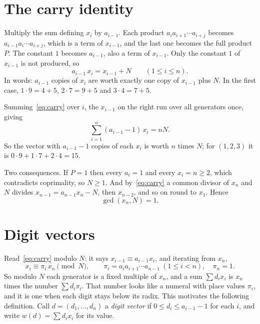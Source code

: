 \documentclass[11pt]{amsart}
\theoremstyle{remark}
\begin{document}
\section{The carry identity}

Multiply the sum defining $x_i$ by $a_{i-1}$. Each product $a_ia_{i+1}\cdots a_{i+j}$ becomes $a_{i-1}a_i\cdots a_{i+j}$, which is a term of $x_{i-1}$, and the last one becomes the full product $P$. The constant $1$ becomes $a_{i-1}$, also a term of $x_{i-1}$. Only the constant $1$ of $x_{i-1}$ is not produced, so
\begin{equation}\label{eq:carry}
a_{i-1}\,x_i=x_{i-1}+N\qquad(1\le i\le n).
\end{equation}
In words: $a_{i-1}$ copies of $x_i$ are worth exactly one copy of $x_{i-1}$ plus $N$. In the first case, $1\cdot9=4+5$, $2\cdot7=9+5$ and $3\cdot4=7+5$.

Summing~\eqref{eq:carry} over $i$, the $x_{i-1}$ on the right run over all generators once, giving
\begin{equation}\label{eq:sum}
\sum_{i=1}^n(a_{i-1}-1)\,x_i=nN .
\end{equation}
So the vector with $a_{i-1}-1$ copies of each $x_i$ is worth $n$ times $N$; for $(1,2,3)$ it is $0\cdot9+1\cdot7+2\cdot4=15$.

Two consequences. If $P=1$ then every $a_i=1$ and every $x_i=n\ge2$, which contradicts coprimality, so $N\ge1$. And by~\eqref{eq:carry} a common divisor of $x_n$ and $N$ divides $x_{n-1}=a_{n-1}x_n-N$, then $x_{n-2}$, and so on round to $x_1$. Hence
\begin{equation}\label{eq:coprime}
\gcd(x_n,N)=1 .
\end{equation}

\section{Digit vectors}

Read~\eqref{eq:carry} modulo $N$: it says $x_{i-1}\equiv a_{i-1}x_i$, and iterating from $x_n$,
\begin{equation}\label{eq:place}
x_i\equiv\pi_i\,x_n\pmod N,\qquad \pi_i=a_ia_{i+1}\cdots a_{n-1}\ (1\le i<n),\quad\pi_n=1 .
\end{equation}
So modulo $N$ each generator is a fixed multiple of $x_n$, and a sum $\sum d_ix_i$ is $x_n$ times the number $\sum d_i\pi_i$. That number looks like a numeral with place values $\pi_i$, and it is one when each digit stays below its radix. This motivates the following definition. Call $d=(d_1,\dots,d_n)$ a \emph{digit vector} if $0\le d_i\le a_{i-1}-1$ for each $i$, and write $w(d)=\sum d_ix_i$ for its value.
\end{document}
